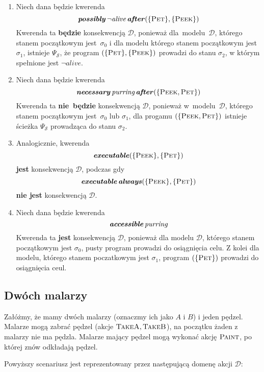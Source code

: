 \documentclass[11pt,a4paper]{article}
\DeclareMathOperator{\After}{\textbf{\textit{after}}}
\DeclareMathOperator{\Always}{\textbf{\textit{always}}}
\DeclareMathOperator{\Executable}{\textbf{\textit{executable}}}
\DeclareMathOperator{\Accessible}{\textbf{\textit{accessible}}}
\DeclareMathOperator{\Possibly}{\textbf{\textit{possibly}}}
\DeclareMathOperator{\Necessary}{\textbf{\textit{necessary}}}
\begin{document}
\begin{enumerate}
    \item Niech dana będzie kwerenda
    $$ \Possibly \neg \textit{alive} \After (\{ \textsc{Pet} \}, \{ \textsc{Peek} \}) $$
    Kwerenda ta \textbf{będzie} konsekwencją $\mathcal{D}$, ponieważ dla~modelu~$\mathcal{D}$, którego stanem początkowym jest~$\sigma_0$ i dla modelu którego stanem początkowym jest $\sigma_1$, istnieje $\Psi_\mathcal{S}$, że program $(\{ \textsc{Pet} \}, \{ \textsc{Peek} \})$ prowadzi do stanu $\sigma_2$, w którym spełnione jest $\neg \textit{alive}$.

    \item Niech dana będzie kwerenda
    $$ \Necessary \textit{purring} \After (\{ \textsc{Peek}, \textsc{Pet} \}) $$
    Kwerenda ta \textbf{nie~będzie} konsekwencją $\mathcal{D}$, ponieważ w~modelu~$\mathcal{D}$, którego stanem początkowym jest~$\sigma_0$ lub $\sigma_1$, dla progamu $(\{ \textsc{Peek}, \textsc{Pet} \})$ istnieje ścieżka $\Psi_\mathcal{S}$ prowadząca   do stanu $\sigma_2$.

    \item Analogicznie, kwerenda
    $$\Executable (\{ \textsc{Peek} \}, \{ \textsc{Pet} \})$$
    \textbf{jest} konsekwencją $\mathcal{D}$, podczas gdy
    $$\Executable \Always (\{ \textsc{Peek} \}, \{ \textsc{Pet} \})$$
    \textbf{nie jest} konsekwencją $\mathcal{D}$.

    \item Niech dana będzie kwerenda
    $$ \Accessible \textit{purring} $$
    Kwerenda ta \textbf{jest} konsekwencją $\mathcal{D}$, ponieważ dla modelu $\mathcal{D}$, którego stanem początkowym jest $\sigma_0$, pusty program prowadzi do osiągnięcia celu. Z kolei dla modelu, którego stanem poczatkowym jest $\sigma_1$, program $(\{\textsc{Pet}\})$ prowadzi do osiągnięcia ceul.
\end{enumerate}

\subsection{Dwóch malarzy}
Załóżmy, że mamy dwóch malarzy (oznaczmy ich jako $A$ i $B$) i jeden pędzel. Malarze mogą zabrać pędzel (akcje $\textsc{TakeA},\textsc{TakeB}$), na początku żaden z malarzy nie ma pędzla. Malarze mający pędzel mogą wykonać akcję $\textsc{Paint}$, po której znów odkładają pędzel.

Powyższy scenariusz jest reprezentowany przez następującą domenę akcji $\mathcal{D}$:
\end{document}
